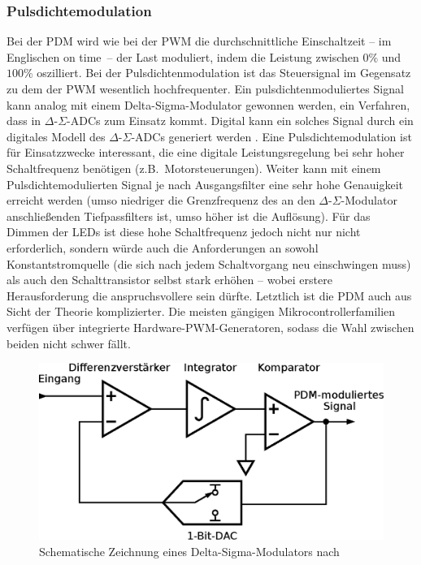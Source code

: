 \documentclass[12pt,a4paper,notitlepage]{article}
\begin{document}
\subsubsection{Pulsdichtemodulation}
Bei der \gls{PDM} wird wie bei der \gls{PWM} die durchschnittliche Einschaltzeit -- im Englischen \glqq on time\grqq\ -- der Last moduliert, indem die Leistung zwischen $0\%$ und $100\%$ oszilliert. Bei der Pulsdichtenmodulation ist das Steuersignal im Gegensatz zu dem der PWM wesentlich hochfrequenter. Ein pulsdichtenmoduliertes Signal kann analog mit einem Delta-Sigma-Modulator gewonnen werden, ein Verfahren, dass in $\Delta$-$\Sigma$-ADCs zum Einsatz kommt. \cite{MAXIM21, MAXIM10} Digital kann ein solches Signal durch ein digitales Modell des $\Delta$-$\Sigma$-ADCs generiert werden \cite{WP1, WP3}. Eine Pulsdichtemodulation ist für Einsatzzwecke interessant, die eine digitale Leistungsregelung bei sehr hoher Schaltfrequenz benötigen (z.B.\ Motorsteuerungen). Weiter kann mit einem Pulsdichtemodulierten Signal je nach Ausgangsfilter eine sehr hohe Genauigkeit erreicht werden (umso niedriger die Grenzfrequenz des an den $\Delta$-$\Sigma$-Modulator anschließenden Tiefpassfilters ist, umso höher ist die Auflösung). Für das Dimmen der LEDs ist diese hohe Schaltfrequenz jedoch nicht nur nicht erforderlich, sondern würde auch die Anforderungen an sowohl Konstantstromquelle (die sich nach jedem Schaltvorgang neu einschwingen muss) als auch den Schalttransistor selbst stark erhöhen -- wobei erstere Herausforderung die anspruchsvollere sein dürfte. Letztlich ist die PDM auch aus Sicht der Theorie komplizierter. Die meisten gängigen Mikrocontrollerfamilien verfügen über integrierte Hardware-PWM-Generatoren, sodass die Wahl zwischen beiden nicht schwer fällt.
\begin{figure}
\begin{center}
\includegraphics{images/delta-sigma-adc.eps}
\caption{Schematische Zeichnung eines Delta-Sigma-Modulators nach \cite{MAXIM21}}
\label{delta-sigma-modulator}
\end{center}
\end{figure}
\end{document}
